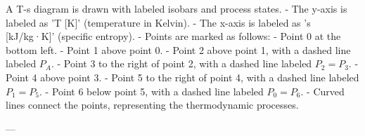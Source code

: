 A T-s diagram is drawn with labeled isobars and process states.  
- The y-axis is labeled as 'T [K]' (temperature in Kelvin).  
- The x-axis is labeled as 's [kJ/kg·K]' (specific entropy).  
- Points are marked as follows:  
  - Point 0 at the bottom left.  
  - Point 1 above point 0.  
  - Point 2 above point 1, with a dashed line labeled \( P_A \).  
  - Point 3 to the right of point 2, with a dashed line labeled \( P_2 = P_3 \).  
  - Point 4 above point 3.  
  - Point 5 to the right of point 4, with a dashed line labeled \( P_1 = P_5 \).  
  - Point 6 below point 5, with a dashed line labeled \( P_0 = P_6 \).  
- Curved lines connect the points, representing the thermodynamic processes.  

---